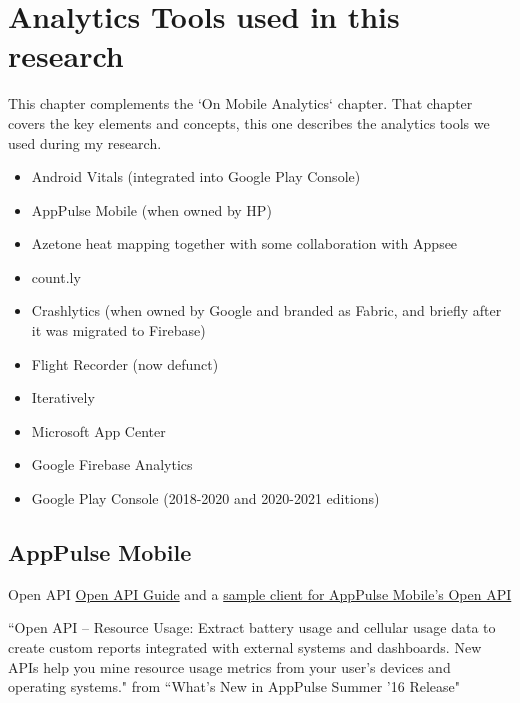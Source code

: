\chapter{Analytics Tools used in this research}
\label{appendix-analytics-tools}

This chapter complements the `On Mobile Analytics` chapter. That chapter covers the key elements and concepts, this one describes the analytics tools we used during my research.

\begin{itemize}
    \item Android Vitals (integrated into Google Play Console)
    \item AppPulse Mobile (when owned by HP)
    \item Azetone heat mapping together with some collaboration with Appsee
    \item count.ly
    \item Crashlytics (when owned by Google and branded as Fabric, and briefly after it was migrated to Firebase)
    \item Flight Recorder (now defunct)
    \item Iteratively
    \item Microsoft App Center
    \item Google Firebase Analytics
    \item Google Play Console (2018-2020 and 2020-2021 editions)
\end{itemize}

\section{AppPulse Mobile}

Open API \href{https://github.com/MicroFocus/apmobile-openapiclient/blob/master/doc/AppPulse_Mobile_Open_API_Guide.pdf}{Open API Guide} and a  \href{https://github.com/MicroFocus/apmobile-openapiclient}{sample client for AppPulse Mobile's Open API}

``Open API – Resource Usage: Extract battery usage and cellular usage data to create custom reports integrated with external systems and dashboards. New APIs help you mine resource usage metrics from your user’s devices and operating systems." from ``What's New in AppPulse Summer '16 Release"

